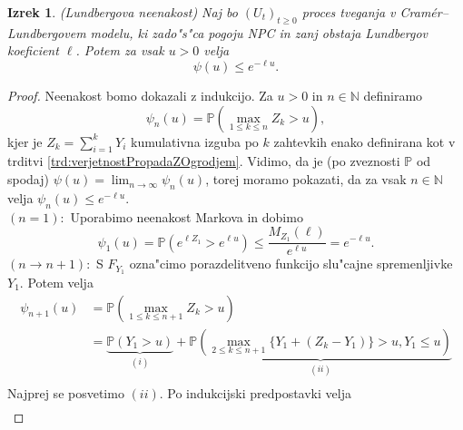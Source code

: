 \documentclass[12pt, a4paper, reqno]{amsart}
\theoremstyle{definition}
\theoremstyle{plain}
\newtheorem{izrek}[definicija]{Izrek}
\newcommand{\N}{\mathbb{N}}
\newcommand{\Prob}{\mathbb{P}}
\newcommand{\1}{\mathds{1}}
\begin{document}
            \begin{izrek}(Lundbergova neenakost)
                Naj bo $(U_t)_{t\geq0}$ proces tveganja v Cramér--Lundbergovem modelu, ki zado"s"ca pogoju NPC in 
                 zanj obstaja Lundbergov koeficient $\ell$. Potem za vsak $u>0$ velja
                \begin{equation*}
                    \psi(u) \leq e^{-\ell u}.
                \end{equation*}
                \label{izr:LundbergovaNeenakost}
            \end{izrek}

            \begin{proof}
                Neenakost bomo dokazali z indukcijo. Za $u>0$ in $n\in\N$ definiramo
                \begin{equation*}
                    \psi_n(u) = \Prob\left(\max_{1\leq k\leq n}Z_k > u\right),
                \end{equation*}
                kjer je $Z_k = \sum_{i=1}^kY_i$ kumulativna izguba po $k$ zahtevkih enako definirana 
                kot v trditvi \ref{trd:verjetnostPropadaZOgrodjem}.
                Vidimo, da je (po zveznosti $\mathbb{P}$ od spodaj) $\psi(u) = \lim_{n\to\infty}\psi_n(u)$, 
                torej moramo pokazati, da za vsak $n\in\N$ velja $\psi_n(u) \leq e^{-\ell u}$. \\
                $(n = 1):$ Uporabimo neenakost Markova in dobimo
                \begin{equation*}
                    \psi_1(u) = \Prob\left(e^{\ell Z_1} > e^{\ell u}\right) \leq \frac{M_{Z_1}(\ell)}{e^{\ell u}} = e^{-\ell u}.
                \end{equation*}
                $(n \rightarrow n+1):$ 
                S $F_{Y_1}$ ozna"cimo porazdelitveno funkcijo slu"cajne spremenljivke
                 $Y_1$. Potem velja
                \begin{align*}
                    \psi_{n+1}(u) &= \Prob\left(\max_{1\leq k\leq n+1}Z_k > u\right) \\
                                  &= \underbrace{\Prob\left(Y_1 > u\right)}_{(i)} + 
                                  \underbrace{\Prob\left(\max_{2\leq k\leq n+1}\bigl\{Y_1 + (Z_k - Y_1)\bigr\} > u, Y_1 \leq u\right)}_{(ii)} \\
                \end{align*}
                Najprej se posvetimo $(ii)$. Po indukcijski predpostavki velja 
                \begin{align*}

\end{align*}
\end{proof}
\end{document}
